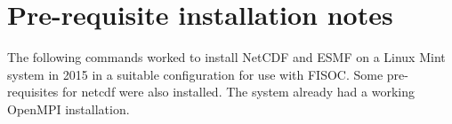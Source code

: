 \documentclass[12pt]{article}
\begin{document}




\clearpage

\appendix

\section{Pre-requisite installation notes}
\label{app:A}
The following commands worked to install NetCDF and ESMF on a Linux Mint system in 2015 
in a suitable configuration for use with FISOC. 
Some pre-requisites for netcdf were also installed.
The system already had a working OpenMPI installation.
\end{document}
